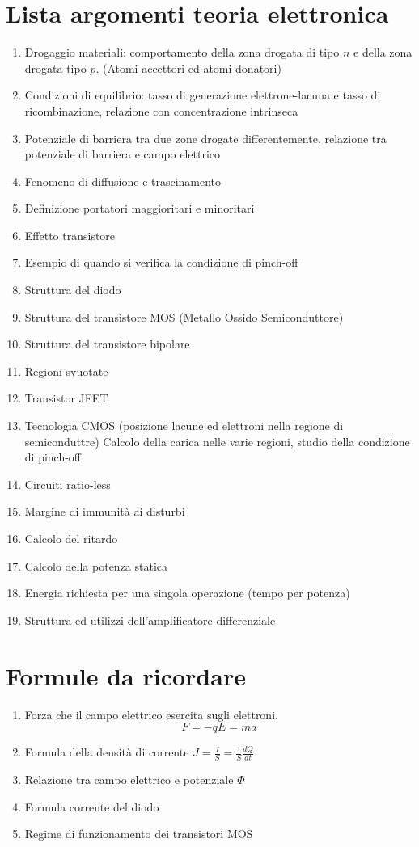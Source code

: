 \documentclass{article}
\begin{document}
\section*{Lista argomenti teoria elettronica}
\begin{enumerate}
    \item Drogaggio materiali: comportamento della zona drogata di tipo $n$ e della zona drogata tipo $p$. (Atomi accettori ed atomi donatori)
    \item Condizioni di equilibrio: tasso di generazione elettrone-lacuna e tasso di ricombinazione, relazione con concentrazione intrinseca
    \item Potenziale di barriera tra due zone drogate differentemente, relazione tra potenziale di barriera e campo elettrico
    \item Fenomeno di diffusione e trascinamento
    \item Definizione portatori maggioritari e minoritari
    \item Effetto transistore
    \item Esempio di quando si verifica la condizione di pinch-off
    \item Struttura del diodo
    \item Struttura del transistore MOS (Metallo Ossido Semiconduttore)
    \item Struttura del transistore bipolare
    \item Regioni svuotate
    \item Transistor JFET
    \item Tecnologia CMOS (posizione lacune ed elettroni nella regione di semiconduttre)
        Calcolo della carica nelle varie regioni, studio della condizione di pinch-off
    \item Circuiti ratio-less
    \item Margine di immunità ai disturbi
    \item Calcolo del ritardo
    \item Calcolo della potenza statica
    \item Energia richiesta per una singola operazione (tempo per potenza)
    \item Struttura ed utilizzi dell'amplificatore differenziale
\end{enumerate}

\section*{Formule da ricordare}
\begin{enumerate}
    \item
        Forza che il campo elettrico esercita sugli elettroni.
        \[
            F = -q E = ma
        \]

    \item Formula della densità di corrente $J = \frac{I}{S} = \frac{1}{S}\frac{dQ}{dt}$
    \item Relazione tra campo elettrico e potenziale $\Phi$
    \item Formula corrente del diodo
    \item Regime di funzionamento dei transistori MOS
\end{enumerate}
\end{document}
